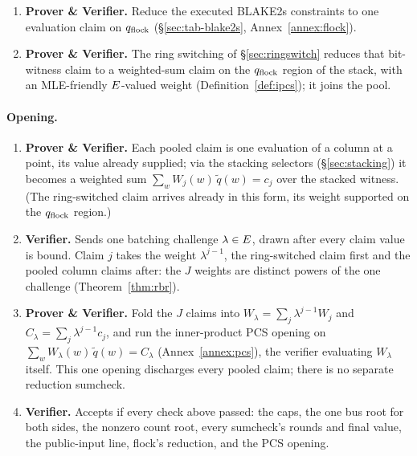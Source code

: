 \begin{enumerate}
\item \textbf{Prover \& Verifier.} Reduce the executed BLAKE2s constraints to one evaluation claim on $q_{\mathrm{flock}}$ (\S\ref{sec:tab-blake2s}, Annex~\ref{annex:flock}).
\item \textbf{Prover \& Verifier.} The ring switching of \S\ref{sec:ringswitch} reduces that bit-witness claim to a weighted-sum claim on the $q_{\mathrm{flock}}$ region of the stack, with an MLE-friendly $E$-valued weight (Definition~\ref{def:ipcs}); it joins the pool.
\end{enumerate}

\paragraph{Opening.}

\begin{enumerate}
\item \textbf{Prover \& Verifier.} Each pooled claim is one evaluation of a column at a point, its value already supplied; via the stacking selectors (\S\ref{sec:stacking}) it becomes a weighted sum $\sum_w W_j(w)\,\widetilde q(w)=c_j$ over the stacked witness. (The ring-switched claim arrives already in this form, its weight supported on the $q_{\mathrm{flock}}$ region.)
\item \textbf{Verifier.} Sends one batching challenge $\lambda\in E$, drawn after every claim value is bound. Claim $j$ takes the weight $\lambda^{j-1}$, the ring-switched claim first and the pooled column claims after: the $J$ weights are distinct powers of the one challenge (Theorem~\ref{thm:rbr}).
\item \textbf{Prover \& Verifier.} Fold the $J$ claims into $W_\lambda=\sum_j\lambda^{j-1} W_j$ and $C_\lambda=\sum_j\lambda^{j-1} c_j$, and run the inner-product PCS opening on $\sum_w W_\lambda(w)\,\widetilde q(w)=C_\lambda$ (Annex~\ref{annex:pcs}), the verifier evaluating $W_\lambda$ itself. This one opening discharges every pooled claim; there is no separate reduction sumcheck.
\item \textbf{Verifier.} Accepts if every check above passed: the caps, the one bus root for both sides, the nonzero count root, every sumcheck's rounds and final value, the public-input line, flock's reduction, and the PCS opening.
\end{enumerate}
